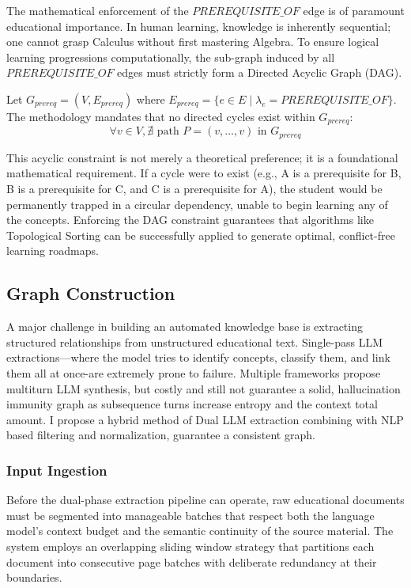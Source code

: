 The mathematical enforcement of the $ {PREREQUISITE\_OF}$ edge is of paramount educational importance. In human learning, knowledge is inherently sequential; one cannot grasp Calculus without first mastering Algebra. To ensure logical learning progressions computationally, the sub-graph induced by all $ {PREREQUISITE\_OF}$ edges must strictly form a {Directed Acyclic Graph (DAG)}. 

Let $G_{prereq} = (V, E_{prereq})$ where $E_{prereq} = \{ e \in E \mid \lambda_e =  {PREREQUISITE\_OF} \}$. The methodology mandates that no directed cycles exist within $G_{prereq}$:
\begin{equation}
    \forall v \in V, \nexists \text{ path } P = (v, \dots, v) \text{ in } G_{prereq}
\end{equation}

This acyclic constraint is not merely a theoretical preference; it is a foundational mathematical requirement. If a cycle were to exist (e.g., A is a prerequisite for B, 
B is a prerequisite for C, and C is a prerequisite for A), the student would be permanently trapped in a circular dependency, unable to begin learning any of the 
concepts. Enforcing the DAG constraint guarantees that algorithms like Topological Sorting can be successfully applied 
to generate optimal, conflict-free learning roadmaps.

\subsection{Graph Construction}

A major challenge in building an automated knowledge base is extracting structured relationships from unstructured educational text. Single-pass LLM extractions—where 
the model tries to identify concepts, classify them, and link them all at once-are extremely prone to failure. Multiple frameworks propose multi\-turn LLM synthesis, but 
costly and still not guarantee a solid, hallucination immunity graph as subsequence turns increase entropy and the context total amount. I propose a hybrid method of Dual LLM extraction combining with NLP based filtering and normalization,
guarantee a consistent graph.
\subsubsection{Input Ingestion}\label{subsub:sliding}

Before the dual-phase extraction pipeline can operate, raw educational documents must be segmented into manageable batches that respect both the language model's context budget and the semantic continuity of the source material. The system employs an overlapping sliding window strategy that partitions each document into consecutive page batches with deliberate redundancy at their boundaries.

